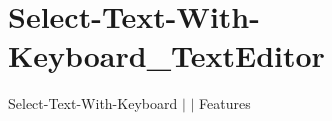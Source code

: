 \chapter{Select-\/\+Text-\/\+With-\/\+Keyboard\+\_\+\+Text\+Editor }
\hypertarget{md__docs_2_text_editor_2_features_2_select-_text-_with-_keyboard___text_editor}{}\label{md__docs_2_text_editor_2_features_2_select-_text-_with-_keyboard___text_editor}
Select-\/\+Text-\/\+With-\/\+Keyboard \texorpdfstring{$\vert$}{|}  \texorpdfstring{$\vert$}{|} Features



 